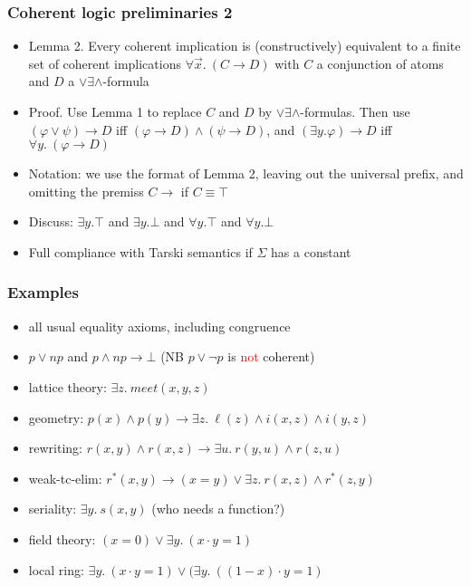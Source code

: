 \documentclass[handout,11pt]{beamer}
\newcommand{\red}[1]{\textcolor{red}{#1}}
\newcommand{\deca}{${\lor}{\exists}{\land}$}
\begin{document}
\begin{frame}
\frametitle{Coherent logic preliminaries 2}
 \begin{itemize}[<+->]   %
    \item Lemma 2. Every coherent implication is (constructively) 
    equivalent to a finite set of coherent implications
    $\forall\vec{x}.~(C \to D)$ 
    with $C$ a conjunction of atoms and $D$ a \deca-formula
    \item Proof. Use Lemma 1 to replace $C$ and $D$ by \deca-formulas.
    Then use $(\varphi\lor\psi)\to D$ iff $(\varphi\to D)\land(\psi\to D)$,
    and $(\exists y.\varphi)\to D$ iff $\forall y.~(\varphi\to D)$
    \item Notation: we use the format of Lemma 2, 
    leaving out the universal prefix, and omitting the premiss $C\to{}$ 
    if $C\equiv\top$
    \item Discuss: $\exists y.\top$ and $\exists y.\bot$ and
    $\forall y.\top$ and $\forall y.\bot$
    \item Full compliance with Tarski semantics if $\Sigma$ has a constant
 \end{itemize}
\end{frame}

\begin{frame}
\frametitle{Examples}
 \begin{itemize}[<+->]   %
    \item all usual equality axioms, including congruence
    \item $p\lor np$ and $p\land np\to\bot$ 
    (NB $p\lor\neg p$ is \red{not} coherent)
    \item lattice theory: $%
    \exists z.~\mathit{meet}(x,y,z)$
    \item geometry: $%
    p(x)\land p(y) \to \exists z.~\ell(z) \land i(x,z) \land i(y,z)$
    \item rewriting: $%
    r(x,y)\land r(x,z) \to \exists u.~r(y,u)\land r(z,u)$
    \item weak-tc-elim: $%
    r^*(x,y)\to (x=y)\lor\exists z.~r(x,z)\land r^*(z,y)$     
    \item seriality: $%
    \exists y.~s(x,y)$ (who needs a function?)
    \item field theory: $%
    (x=0) \lor \exists y.~(x\cdot y=1)$
    \item local ring: 
    $\exists y.~(x\cdot y = 1) \lor (\exists y.~((1-x)\cdot y = 1)$
 \end{itemize}
\end{frame}
\end{document}
